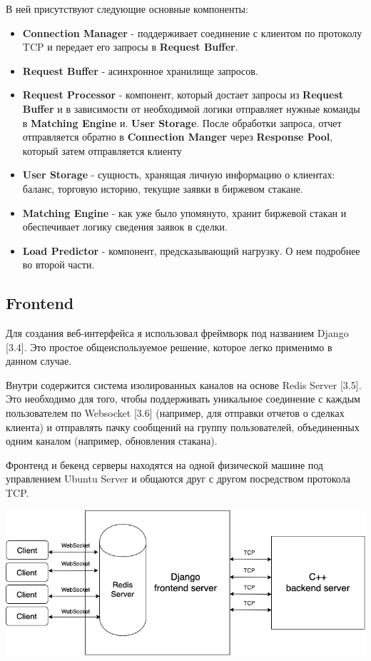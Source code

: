 В ней присутствуют следующие основные компоненты:

\begin{itemize}
    \item \textbf{Connection Manager} - поддерживает соединение с клиентом по протоколу TCP и передает его запросы в \textbf{Request Buffer}.
    \item \textbf{Request Buffer} - асинхронное хранилище запросов.
    \item \textbf{Request Processor} - компонент, который достает запросы из \textbf{Request Buffer} и в зависимости от необходимой логики отправляет нужные команды в \textbf{Matching Engine} и. \textbf{User Storage}. После обработки запроса, отчет отправляется обратно в \textbf{Connection Manger} через \textbf{Response Pool}, который затем отправляется клиенту
    \item \textbf{User Storage} - сущность, хранящая личную информацию о клиентах: баланс, торговую историю, текущие заявки в биржевом стакане.
    \item \textbf{Matching Engine} - как уже было упомянуто, хранит биржевой стакан и обеспечивает логику сведения заявок в сделки.
    \item \textbf{Load Predictor} - компонент, предсказывающий нагрузку. О нем подробнее во второй части.
\end{itemize}


\newpage

\subsection{Frontend}

Для создания веб-интерфейса я использовал фреймворк под названием Django [3.4]. Это простое общеиспользуемое решение, которое легко применимо в данном случае.

Внутри содержится система изолированных каналов на основе Redis Server [3.5]. Это необходимо для того, чтобы поддерживать уникальное соединение с каждым пользователем по Websocket [3.6] (например, для отправки отчетов о сделках клиента) и отправлять пачку сообщений на группу пользователей, объединенных одним каналом (например, обновления стакана).

Фронтенд и бекенд серверы находятся на одной физической машине под управлением Ubuntu Server и общаются друг с другом посредством протокола TCP.

\begin{center}\includegraphics[width=450pt]{images/frontend_schema.png}\end{center}

